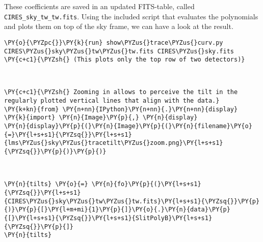 These coefficients are saved in an updated FITS-table, called
\texttt{CIRES\_sky\_tw\_tw.fits}. Using the included script that
evaluates the polynomials and plots them on top of the sky frame, we can
have a look at the result.

    \begin{tcolorbox}[breakable, size=fbox, boxrule=1pt, pad at break*=1mm,colback=cellbackground, colframe=cellborder]
\begin{Verbatim}[commandchars=\\\{\}]
\PY{o}{\PYZpc{}}\PY{k}{run} show\PYZus{}trace\PYZus{}curv.py CIRES\PYZus{}sky\PYZus{}tw\PYZus{}tw.fits CIRES\PYZus{}sky.fits
\PY{c+c1}{\PYZsh{} (This plots only the top row of two detectors)}
\end{Verbatim}
\end{tcolorbox}

\begin{center}
\end{center}
{ \hspace*{\fill} \\}

\begin{tcolorbox}[breakable, size=fbox, boxrule=1pt, pad at break*=1mm,colback=cellbackground, colframe=cellborder]
\begin{Verbatim}[commandchars=\\\{\}]
\PY{c+c1}{\PYZsh{} Zooming in allows to perceive the tilt in the regularly plotted vertical lines that align with the data.}
\PY{k+kn}{from} \PY{n+nn}{IPython}\PY{n+nn}{.}\PY{n+nn}{display} \PY{k}{import} \PY{n}{Image}\PY{p}{,} \PY{n}{display}
\PY{n}{display}\PY{p}{(}\PY{n}{Image}\PY{p}{(}\PY{n}{filename}\PY{o}{=}\PY{l+s+s1}{\PYZsq{}}\PY{l+s+s1}{lms\PYZus{}sky\PYZus{}tracetilt\PYZus{}zoom.png}\PY{l+s+s1}{\PYZsq{}}\PY{p}{)}\PY{p}{)}
\end{Verbatim}
\end{tcolorbox}

\begin{center}
\end{center}
{ \hspace*{\fill} \\}

\begin{tcolorbox}[breakable, size=fbox, boxrule=1pt, pad at break*=1mm,colback=cellbackground, colframe=cellborder]
\begin{Verbatim}[commandchars=\\\{\}]
\PY{n}{tilts} \PY{o}{=} \PY{n}{fo}\PY{p}{(}\PY{l+s+s1}{\PYZsq{}}\PY{l+s+s1}{CIRES\PYZus{}sky\PYZus{}tw\PYZus{}tw.fits}\PY{l+s+s1}{\PYZsq{}}\PY{p}{)}\PY{p}{[}\PY{l+m+mi}{1}\PY{p}{]}\PY{o}{.}\PY{n}{data}\PY{p}{[}\PY{l+s+s1}{\PYZsq{}}\PY{l+s+s1}{SlitPolyB}\PY{l+s+s1}{\PYZsq{}}\PY{p}{]}
\PY{n}{tilts}
\end{Verbatim}
\end{tcolorbox}

